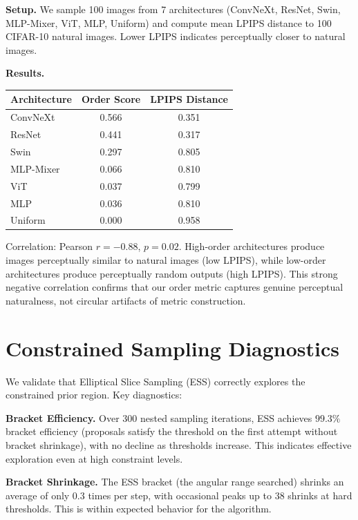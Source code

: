 \textbf{Setup.} We sample 100 images from 7 architectures (ConvNeXt, ResNet, Swin, MLP-Mixer, ViT, MLP, Uniform) and compute mean LPIPS distance to 100 CIFAR-10 natural images. Lower LPIPS indicates perceptually closer to natural images.

\textbf{Results.}
\begin{center}
\begin{tabular}{lcc}
\toprule
Architecture & Order Score & LPIPS Distance \\
\midrule
ConvNeXt & 0.566 & 0.351 \\
ResNet & 0.441 & 0.317 \\
Swin & 0.297 & 0.805 \\
MLP-Mixer & 0.066 & 0.810 \\
ViT & 0.037 & 0.799 \\
MLP & 0.036 & 0.810 \\
Uniform & 0.000 & 0.958 \\
\bottomrule
\end{tabular}
\end{center}

Correlation: Pearson $r = -0.88$, $p = 0.02$. High-order architectures produce images perceptually similar to natural images (low LPIPS), while low-order architectures produce perceptually random outputs (high LPIPS). This strong negative correlation confirms that our order metric captures genuine perceptual naturalness, not circular artifacts of metric construction.




\section{Constrained Sampling Diagnostics}
\label{app:ess}

We validate that Elliptical Slice Sampling (ESS) correctly explores the constrained prior region. Key diagnostics:

\textbf{Bracket Efficiency.} Over 300 nested sampling iterations, ESS achieves $99.3\%$ bracket efficiency (proposals satisfy the threshold on the first attempt without bracket shrinkage), with no decline as thresholds increase. This indicates effective exploration even at high constraint levels.

\textbf{Bracket Shrinkage.} The ESS bracket (the angular range searched) shrinks an average of only 0.3 times per step, with occasional peaks up to 38 shrinks at hard thresholds. This is within expected behavior for the algorithm.

